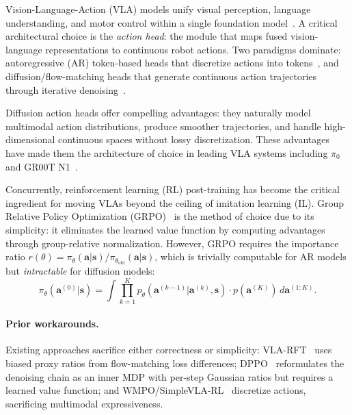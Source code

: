 \documentclass{article}
\newcommand{\ba}{\mathbf{a}}
\newcommand{\bs}{\mathbf{s}}
\begin{document}
Vision-Language-Action (VLA) models unify visual perception, language understanding, and motor control within a single foundation model~\cite{brohan2023rt2,black2024pi0,kim2024openvla}.
A critical architectural choice is the \emph{action head}: the module that maps fused vision-language representations to continuous robot actions.
Two paradigms dominate: autoregressive (AR) token-based heads that discretize actions into tokens~\cite{brohan2023rt2,kim2024openvla}, and diffusion/flow-matching heads that generate continuous action trajectories through iterative denoising~\cite{chi2023diffusionpolicy,black2024pi0,bjorck2025gr00tn1}.

Diffusion action heads offer compelling advantages: they naturally model multimodal action distributions, produce smoother trajectories, and handle high-dimensional continuous spaces without lossy discretization.
These advantages have made them the architecture of choice in leading VLA systems including $\pi_0$~\cite{black2024pi0} and GR00T N1~\cite{bjorck2025gr00tn1}.

Concurrently, reinforcement learning (RL) post-training has become the critical ingredient for moving VLAs beyond the ceiling of imitation learning (IL).
Group Relative Policy Optimization (GRPO)~\cite{shao2024deepseekmath} is the method of choice due to its simplicity: it eliminates the learned value function by computing advantages through group-relative normalization.
However, GRPO requires the importance ratio $r(\theta) = \pi_\theta(\ba|\bs) / \pi_{\theta_\text{old}}(\ba|\bs)$, which is trivially computable for AR models but \emph{intractable} for diffusion models:
\begin{equation}
\label{eq:marginal}
\pi_\theta(\ba^{(0)} | \bs) = \int \prod_{k=1}^{K} p_\theta(\ba^{(k-1)} | \ba^{(k)}, \bs) \cdot p(\ba^{(K)})\, d\ba^{(1:K)}.
\end{equation}

\paragraph{Prior workarounds.}
Existing approaches sacrifice either correctness or simplicity: VLA-RFT~\cite{zhai2024vlarft} uses biased proxy ratios from flow-matching loss differences; DPPO~\cite{ren2024dppo} reformulates the denoising chain as an inner MDP with per-step Gaussian ratios but requires a learned value function; and WMPO/SimpleVLA-RL~\cite{wang2025wmpo,wu2025simplevlarl} discretize actions, sacrificing multimodal expressiveness.
\end{document}

